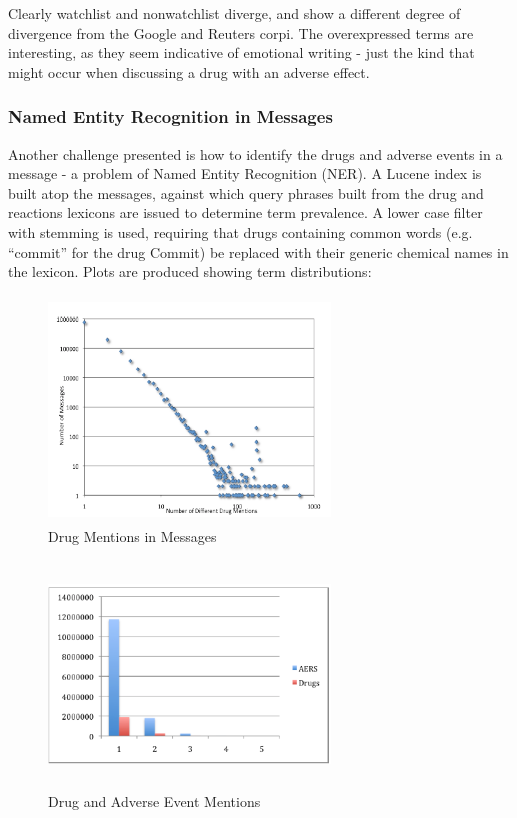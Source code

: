 \documentclass[twoside,11pt]{article}
\begin{document}
Clearly watchlist and nonwatchlist diverge, and show a different degree of divergence from the Google and Reuters corpi. The overexpressed terms are interesting, as they seem indicative of emotional writing - just the kind that might occur when discussing a drug with an adverse effect.

\subsubsection{Named Entity Recognition in Messages}
Another challenge presented is how to identify the drugs and adverse events in a message - a problem of Named Entity Recognition (NER). A Lucene index is built atop the messages, against which query phrases built from the drug and reactions lexicons are issued to determine term prevalence. A lower case filter with stemming is used, requiring that drugs containing common words (e.g. ``commit'' for the drug Commit) be replaced with their generic chemical names in the lexicon. Plots are produced showing term distributions:

\hspace{-1cm}\begin{minipage}{.5\textwidth}
  \centering
  \begin{figure}[H]
    \caption{Drug Mentions in Messages}
    \label{fig:zipfian}
    \includegraphics[width=7.5cm, height=6cm]{Figure-1-Zipfian.png}
  \end{figure}
\end{minipage}%
\hspace{.25cm}\begin{minipage}{.5\textwidth}
  \centering
  \begin{figure}[H]
    \caption{Drug and Adverse Event Mentions}
    \label{fig:mentions}
    \includegraphics[width=7.5cm, height=6cm]{Figure-2-AERS_Drugs.png}
  \end{figure}
\end{minipage}
\end{document}
